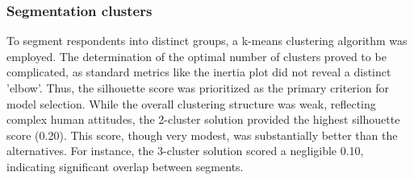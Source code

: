 	\subsubsection{Segmentation clusters}
	To segment respondents into distinct groups, a k-means clustering algorithm was employed. The determination of the optimal number of clusters proved to be complicated, as standard metrics like the inertia plot did not reveal a distinct 'elbow'. Thus, the silhouette score was prioritized as the primary criterion for model selection. While the overall clustering structure was weak, reflecting complex human attitudes, the 2-cluster solution provided the highest silhouette score (0.20). This score, though very modest, was substantially better than the alternatives. For instance, the 3-cluster solution scored a negligible 0.10, indicating significant overlap between segments.

